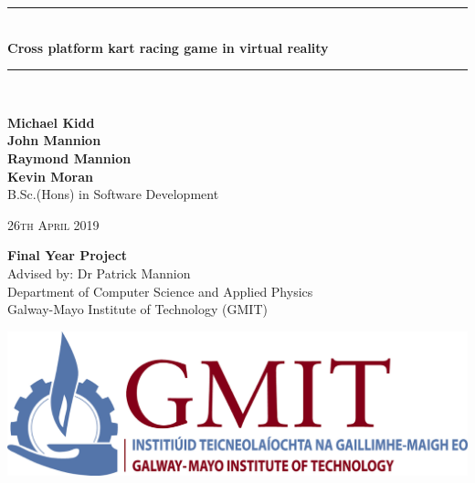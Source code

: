 \documentclass[12pt,a4paper,oneside,openany]{book}
\newcommand{\projecttitle}{Cross platform kart racing game in virtual reality}
\newcommand{\projectauthor}{Michael Kidd \\[0.2cm] John Mannion \\[0.2cm] Raymond Mannion \\[0.2cm] Kevin Moran}
\newcommand{\projectadvisor}{Dr Patrick Mannion}
\newcommand{\projectprogramme}{B.Sc.(Hons) in Software Development}
\newcommand{\projectdate}{26th April 2019}
\begin{document}
  
  \begin{titlepage}
  
    \begin{minipage}[t][6cm]{\textwidth}
      \centering
      \rule{\linewidth}{0.5mm} \\[0.4cm]
      { \LARGE \bfseries \projecttitle \\[0.4cm] }
      \rule{\linewidth}{0.5mm} \\[0.8cm]
    \end{minipage}

    \begin{minipage}[t][6.5cm]{\textwidth}
      \centering
      \textbf{\projectauthor}\\[0.5cm]
      \projectprogramme
    \end{minipage}

    \begin{minipage}[t][1cm]{\textwidth}
      \centering
      \textsc{\projectdate}
    \end{minipage}

    \begin{minipage}[t][3cm]{\textwidth}
      \centering
      \textbf{Final Year Project}\\[0.3cm]
      Advised by: \projectadvisor \\[0.1cm]
      Department of Computer Science and Applied Physics\\
      Galway-Mayo Institute of Technology (GMIT)
    \end{minipage}

    \begin{center}
      \includegraphics{img/gmit-logo.jpg}
    \end{center}
  
  \end{titlepage}
  
  \setcounter{page}{2}
  
  \tableofcontents
  
  
  
  
  
\end{document}
